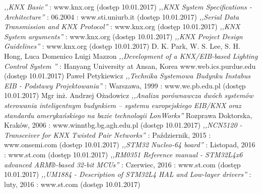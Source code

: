 \documentclass[a4paper, 11pt]{report}
\begin{document}
\newpage
\begin{thebibliography}{99}
 \textit{,,KNX Basic''} : www.knx.org (dostęp 10.01.2017)
 \textit{,,KNX System Specifications - Architecture''} : 06.2004 : www.sti.uniurb.it (dostęp 10.01.2017)
 \textit{,,Serial Data Transmission and KNX Protocol''} : www.knx.org (dostęp 10.01.2017)
 \textit{,,KNX System arguments''} : www.knx.org (dostęp 10.01.2017)
 \textit{,,KNX Project Design Guidelines''} : www.knx.org (dostęp 10.01.2017)
 D. K. Park, W. S. Lee, S. H. Hong, Luca Domenico Luigi Mazzon \textit{,,Development of a KNX/EIB-based Lighting Control System ''} :  Hanyang University at Ansan, Korea www.web.ics.purdue.edu (dostęp 10.01.2017)
 Paweł Petykiewicz \textit{,,Technika Systemowa Budynku Instabus EIB - Podstawy Projektowania''} : Warszawa, 1999 : www.we.pb.edu.pl (dostęp 10.01.2017)
 Mgr inż. Andrzej Ożadowicz \textit{,,Analiza porównawcza
dwóch systemów sterowania inteligentnym budynkiem –
systemu europejskiego EIB/KNX oraz standardu amerykańskiego
na bazie technologii LonWorks''} Rozprawa Doktorska, Kraków, 2006 : www.winntbg.bg.agh.edu.pl (dostęp 10.01.2017)
 \textit{,,NCN5120 - Transceiver for KNX Twisted Pair Networks''} : Październik, 2015 : www.onsemi.com (dostęp 10.01.2017)
 \textit{,,STM32 Nucleo-64 board''} : Listopad, 2016 : www.st.com (dostęp 10.01.2017)
 \textit{,,RM0351 Reference manual - STM32L4x6 advanced ARM®-based 32-bit MCUs''} : Czerwiec, 2016 : www.st.com (dostęp 10.01.2017)
 \textit{,,UM1884 - Description of STM32L4 HAL and Low-layer drivers''} : luty, 2016 : www.st.com (dostęp 10.01.2017)

\end{thebibliography}
\end{document}
